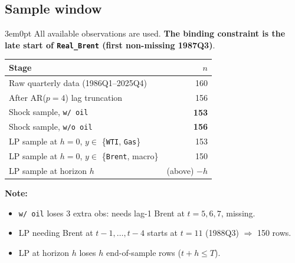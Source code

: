 \documentclass[12pt]{article}
\newenvironment{bodyL2}{\begin{adjustwidth}{3em}{0pt}}{\end{adjustwidth}}
\begin{document}
\subsection{Sample window}
\begin{bodyL2}
All available observations are used. \textbf{The binding constraint is the late start of
\texttt{Real\_Brent} (first non-missing 1987Q3)}.

\begin{center}
\renewcommand{\arraystretch}{1.15}
\begin{tabular}{lr}
\toprule
Stage & $n$ \\
\midrule
Raw quarterly data (1986Q1--2025Q4)            & 160 \\
After AR($p = 4$) lag truncation               & 156 \\
\midrule
Shock sample, \texttt{w/ oil}                    & \textbf{153} \\
Shock sample, \texttt{w/o oil}                 & \textbf{156} \\
\midrule
LP sample at $h = 0$, $y \in$ \{\texttt{WTI}, \texttt{Gas}\}    & 153 \\
LP sample at $h = 0$, $y \in$ \{\texttt{Brent}, macro\}         & 150 \\
LP sample at horizon $h$                       & (above) $- h$ \\
\bottomrule
\end{tabular}
\end{center}

\smallskip
\textbf{Note:}
\begin{itemize}
    \item[--] \texttt{w/ oil} loses 3 extra obs: needs lag-1 Brent at $t = 5,6,7$, missing.
    \item[--] LP needing Brent at $t-1,\ldots,t-4$ starts at $t = 11$ (1988Q3) $\Rightarrow$ 150 rows.
    \item[--] LP at horizon $h$ loses $h$ end-of-sample rows ($t + h \le T$).
\end{itemize}
\end{bodyL2}
\end{document}
